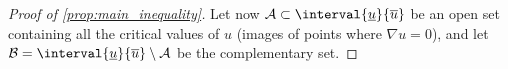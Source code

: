 \documentclass[titlepage,numbers=noenddot,oneside,%
cleardoublepage=empty,paper=a4,fontsize=11pt,%
english,%
]{scrartcl}
\begin{document}
{\begin{proof}[Proof of \cref{prop:main_inequality}]
            
            
            Let now \( \mathcal{A}\subset \interval{\minu}{\maxu} \) be an open set containing all the critical values of \( u \) (images of points where \( \nabla u=0 \)), and let \( \mathcal{B}=\interval{\minu}{\maxu}\setminus \mathcal{A} \) be the complementary set.
            

\end{proof}}
\end{document}

